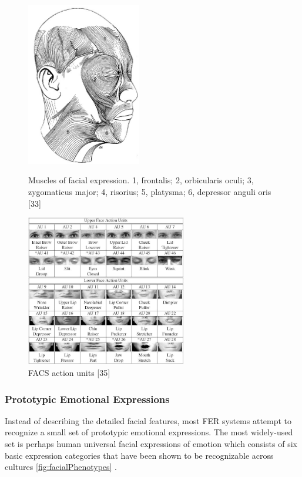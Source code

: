 \documentclass[12pt, twoside]{report}
\begin{document}
	\begin{figure}[h]%
		\begin{minipage}[t]{.5\textwidth}
    		\centering
    		\includegraphics[width=5cm]{img/10_1.jpeg}%
			\caption{Muscles of facial expression. 1,
				frontalis; 2, orbicularis oculi; 3, zygomaticus
				major; 4, risorius; 5, platysma; 6, depressor
				anguli oris [33]}
		\end{minipage}
		\begin{minipage}[t]{.5\textwidth}
    		\includegraphics[width=7cm]{img/10_2.jpeg}%
			\centering
			\caption{FACS action units [35]}
		\end{minipage}
		\label{fig:example}%
	\end{figure}

	\newpage
	
\subsubsection{Prototypic Emotional Expressions}
Instead of describing the detailed facial features, most FER systems attempt to recognize a small set of prototypic emotional expressions. The most widely-used set is perhaps human universal facial expressions of emotion which consists of six basic expression categories that have been shown to be recognizable across cultures \ref{fig:facialPhenotypes} .
\end{document}
